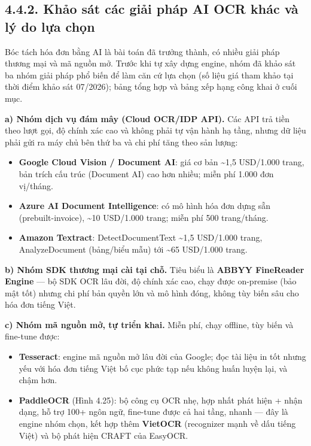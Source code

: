\subsection*{4.4.2. Khảo sát các giải pháp AI OCR khác và lý do lựa chọn}
Bóc tách hóa đơn bằng AI là bài toán đã trưởng thành, có nhiều giải pháp thương mại và mã nguồn mở. Trước khi tự xây dựng engine, nhóm đã khảo sát ba nhóm giải pháp phổ biến để làm căn cứ lựa chọn (số liệu giá tham khảo tại thời điểm khảo sát 07/2026); bảng tổng hợp và bảng xếp hạng công khai ở cuối mục.

\textbf{a) Nhóm dịch vụ đám mây (Cloud OCR/IDP API).} Các API trả tiền theo lượt gọi, độ chính xác cao và không phải tự vận hành hạ tầng, nhưng dữ liệu phải gửi ra máy chủ bên thứ ba và chi phí tăng theo sản lượng:
\begin{itemize}[leftmargin=1.4em,itemsep=1pt,topsep=2pt]
  \item \textbf{Google Cloud Vision / Document AI}: giá cơ bản \textasciitilde{}1,5 USD/1.000 trang, bản trích cấu trúc (Document AI) cao hơn nhiều; miễn phí 1.000 đơn vị/tháng.
  \item \textbf{Azure AI Document Intelligence}: có mô hình hóa đơn dựng sẵn (prebuilt-invoice), \textasciitilde{}10 USD/1.000 trang; miễn phí 500 trang/tháng.
  \item \textbf{Amazon Textract}: DetectDocumentText \textasciitilde{}1,5 USD/1.000 trang, AnalyzeDocument (bảng/biểu mẫu) tới \textasciitilde{}65 USD/1.000 trang.
\end{itemize}

\textbf{b) Nhóm SDK thương mại cài tại chỗ.} Tiêu biểu là \textbf{ABBYY FineReader Engine} — bộ SDK OCR lâu đời, độ chính xác cao, chạy được on-premise (bảo mật tốt) nhưng chi phí bản quyền lớn và mô hình đóng, không tùy biến sâu cho hóa đơn tiếng Việt.

\textbf{c) Nhóm mã nguồn mở, tự triển khai.} Miễn phí, chạy offline, tùy biến và fine-tune được:
\begin{itemize}[leftmargin=1.4em,itemsep=1pt,topsep=2pt]
  \item \textbf{Tesseract}: engine mã nguồn mở lâu đời của Google; đọc tài liệu in tốt nhưng yếu với hóa đơn tiếng Việt bố cục phức tạp nếu không huấn luyện lại, và chậm hơn.
  \item \textbf{PaddleOCR} (Hình 4.25): bộ công cụ OCR nhẹ, hợp nhất phát hiện + nhận dạng, hỗ trợ 100+ ngôn ngữ, fine-tune được cả hai tầng, nhanh — đây là engine nhóm chọn, kết hợp thêm \textbf{VietOCR} (recognizer mạnh về dấu tiếng Việt) và bộ phát hiện CRAFT của EasyOCR.
\end{itemize}

